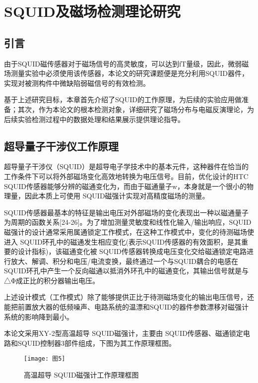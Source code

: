 \documentclass[a4paper,12pt，twoside]{ctexart}
\begin{document}
	
	\newpage 
	\section{SQUID及磁场检测理论研究}
	
	\subsection{引言}
	由于SQUID磁传感器对于磁场信号的高灵敏度，可以达到fT量级，因此，微弱磁场测量实验中必须使用该传感器，本论文的研究课题便是充分利用SQUID器件，实现对被测构件中微缺陷弱磁信号的有效检测。\par
	基于上述研究目标，本章首先介绍了SQUID的工作原理，为后续的实验应用做准备；其次，作为本论文的根本检测对象，详细研究了磁场分布与电磁反演理论，为后续实验检测过程中的数据处理和结果展示提供理论指导。\par
	\subsection{超导量子干涉仪工作原理}
	超导量子干涉仪（SQUID）是超导电子学技术中的基本元件，这种器件在恰当的工作条件下可以将外部磁场变化高效地转换为电压信号。目前，优化设计的HTC SQUID传感器能够分辨的磁通变化为，而由于磁通量子w，本身就是一个很小的物理量，因此本质上可使用 SQUID磁强计实现对高精度磁场的测量。\par
	SQUID传感器最基本的特征是输出电压对外部磁场的变化表现出一种以磁通量子为周期的函数关系[24-26]。为了增加测量灵敏度和线性化输入/输出响应，SQUID磁强计的设计通常采用属通锁定工作模式，在这种工作模式中，变化的待测磁场使进入 SQUID环孔中的磁通发生相应变化(表示SQUID传感器的有效面积，是其重要的设计指标)，该磁通变化被 SQUID传感器转换成电压变化交给磁通锁定电路进行放大、解调、积分和电压/电流变换，最终通过一个与SQUID耦合的电感在SQUID环孔中产生一个反向磁通以抵消外环孔中的磁通变化，其输出信号就是与△Φ成正比的积分器输出电压。\par
	上述设计模式（工作模式）除了能够提供正比于待测磁场变化的输出电压信号，还能把前置放大器的低频噪声、电路系统的温漂和SQUID的器件参数漂移对磁强计系统的影响降到最小。 \par               
	本论文采用XY-2型高温超导 SQUID磁强计，主要由 SQUID传感器、磁通锁定电路和SQUID控制器3部件组成，下图为其工作原理框图。\par
	
	\begin{figure}[htbp]
		\centering
		\texttt{[image: 图5]}
		\caption{高温超导 SQUID磁强计工作原理框图}\label{图5}
	\end{figure}
	
\end{document}
